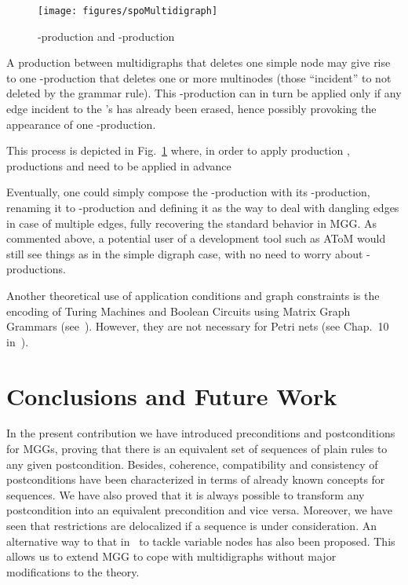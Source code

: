 \documentclass{fundam}
\begin{document}
\begin{figure}[htbp]
  \centering
  \texttt{[image: figures/spoMultidigraph]}
  \caption{-production and -production}
  \label{fig:spoMultidigraph}
\end{figure}

A production  between multidigraphs that deletes
one simple node  may give rise to one -production
that deletes one or more multinodes  (those ``incident'' to 
not deleted by the grammar rule).  This -production can
in turn be applied only if any edge incident to the 's has
already been erased, hence possibly provoking the appearance of one
-production.

This process is depicted in Fig.~\ref{fig:spoMultidigraph} where, in
order to apply production , productions  and 
need to be applied in advance


Eventually, one could simply compose the -production with its
-production, renaming it to -production and
defining it as the way to deal with dangling edges in case of multiple
edges, fully recovering the standard behavior in MGG. As commented
above, a potential user of a development tool such as AToM would
still see things as in the simple digraph case, with no need to worry
about -productions.

Another theoretical use of application conditions and graph
constraints is the encoding of Turing Machines and Boolean
Circuits using Matrix Graph Grammars (see~\cite{MGGmodel}). However,
they are not necessary for Petri nets (see Chap.~10
in~\cite{MGGBook}).

\section{Conclusions and Future Work}
\label{sec:conclusions}


In the present contribution we have introduced preconditions and
postconditions for MGGs, proving that there is an equivalent set of
sequences of plain rules to any given postcondition. Besides,
coherence, compatibility and consistency of postconditions have been
characterized in terms of already known concepts for sequences. We
have also proved that it is always possible to transform any
postcondition into an equivalent precondition and vice
versa. Moreover, we have seen that restrictions are delocalized if a
sequence is under consideration. An alternative way to that
in~\cite{Hof05} to tackle variable nodes has also been proposed. This
allows us to extend MGG to cope with multidigraphs without major
modifications to the theory.
\end{document}
